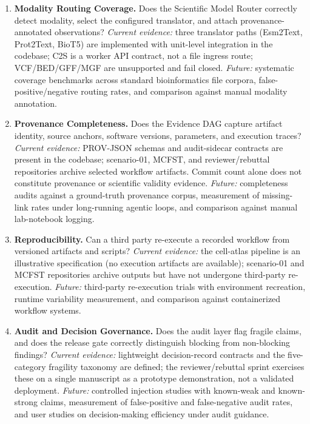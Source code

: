 \documentclass[sn-basic,Numbered,pdflatex]{sn-jnl}
\begin{document}
\begin{enumerate}[leftmargin=*,itemsep=2pt]
    \item \textbf{Modality Routing Coverage.} Does the Scientific Model Router correctly detect modality, select the configured translator, and attach provenance-annotated observations? \textit{Current evidence:} three translator paths (Esm2Text, Prot2Text, BioT5) are implemented with unit-level integration in the codebase; C2S is a worker API contract, not a file ingress route; VCF/BED/GFF/MGF are unsupported and fail closed. \textit{Future:} systematic coverage benchmarks across standard bioinformatics file corpora, false-positive/negative routing rates, and comparison against manual modality annotation.
    \item \textbf{Provenance Completeness.} Does the Evidence DAG capture artifact identity, source anchors, software versions, parameters, and execution traces? \textit{Current evidence:} PROV-JSON schemas and audit-sidecar contracts are present in the codebase; scenario-01, MCFST, and reviewer/rebuttal repositories archive selected workflow artifacts. Commit count alone does not constitute provenance or scientific validity evidence. \textit{Future:} completeness audits against a ground-truth provenance corpus, measurement of missing-link rates under long-running agentic loops, and comparison against manual lab-notebook logging.
    \item \textbf{Reproducibility.} Can a third party re-execute a recorded workflow from versioned artifacts and scripts? \textit{Current evidence:} the cell-atlas pipeline is an illustrative specification (no execution artifacts are available); scenario-01 and MCFST repositories archive outputs but have not undergone third-party re-execution. \textit{Future:} third-party re-execution trials with environment recreation, runtime variability measurement, and comparison against containerized workflow systems.
    \item \textbf{Audit and Decision Governance.} Does the audit layer flag fragile claims, and does the release gate correctly distinguish blocking from non-blocking findings? \textit{Current evidence:} lightweight decision-record contracts and the five-category fragility taxonomy are defined; the reviewer/rebuttal sprint exercises these on a single manuscript as a prototype demonstration, not a validated deployment. \textit{Future:} controlled injection studies with known-weak and known-strong claims, measurement of false-positive and false-negative audit rates, and user studies on decision-making efficiency under audit guidance.
\end{enumerate}
\end{document}
